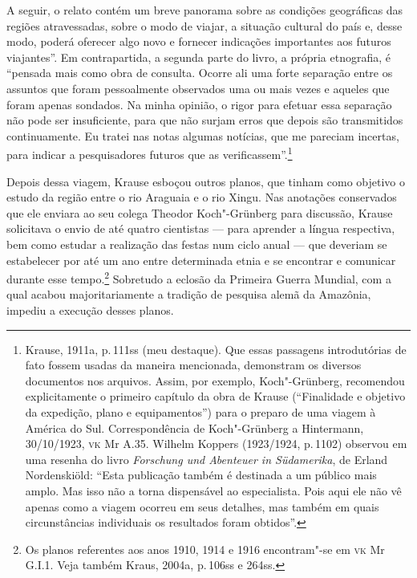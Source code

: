 A seguir, o relato
contém um breve panorama sobre as condições geográficas das regiões
atravessadas, sobre o modo de viajar, a situação cultural do país e,
desse modo, poderá oferecer algo novo e fornecer indicações importantes
aos futuros viajantes''. Em contrapartida, a segunda parte do livro, a
própria etnografia, é ``pensada mais como obra de consulta. Ocorre ali
uma forte separação entre os assuntos que foram pessoalmente observados
uma ou mais vezes e aqueles que foram apenas sondados. Na minha opinião,
o rigor para efetuar essa separação não pode ser insuficiente, para que
não surjam erros que depois são transmitidos continuamente. Eu tratei
nas notas algumas notícias, que me pareciam incertas, para indicar a
pesquisadores futuros que as verificassem''.\footnote{Krause, 1911a, p.\,111ss (meu destaque). Que essas passagens introdutórias de fato fossem
  usadas da maneira mencionada, demonstram os diversos documentos nos
  arquivos. Assim, por exemplo, Koch"-Grünberg, recomendou
  explicitamente o primeiro capítulo da obra de Krause (``Finalidade e objetivo da
  expedição, plano e equipamentos'') para o preparo de uma viagem à
  América do Sul. Correspondência de Koch"-Grünberg a Hintermann,
  30/10/1923, \textsc{vk} Mr A.35. Wilhelm Koppers (1923/1924, p.\,1102) observou em
  uma resenha do livro \emph{Forschung und Abenteuer in Südamerika}, de Erland Nordenskiöld:
  ``Esta publicação também é destinada a um público mais amplo. Mas isso
  não a torna dispensável ao especialista. Pois aqui ele não vê apenas
  como a viagem ocorreu em seus detalhes, mas também em quais
  circunstâncias individuais os resultados foram obtidos''.}

Depois dessa viagem, Krause esboçou outros planos, que tinham como
objetivo o estudo da região entre o rio Araguaia e o rio Xingu. Nas
anotações conservados que ele enviara ao seu colega Theodor
Koch"-Grünberg para discussão, Krause solicitava o envio de até quatro
cientistas --- para aprender a língua respectiva, bem como estudar a
realização das festas num ciclo anual --- que deveriam se estabelecer por
até um ano entre determinada etnia e se encontrar e comunicar durante
esse tempo.\footnote{Os planos referentes aos anos 1910, 1914 e 1916
  encontram"-se em \textsc{vk} Mr G.I.1. Veja também Kraus, 2004a, p.\,106ss e
  264ss.} Sobretudo a eclosão da Primeira Guerra Mundial, com a qual
acabou majoritariamente a tradição de pesquisa alemã da Amazônia,
impediu a execução desses planos.

